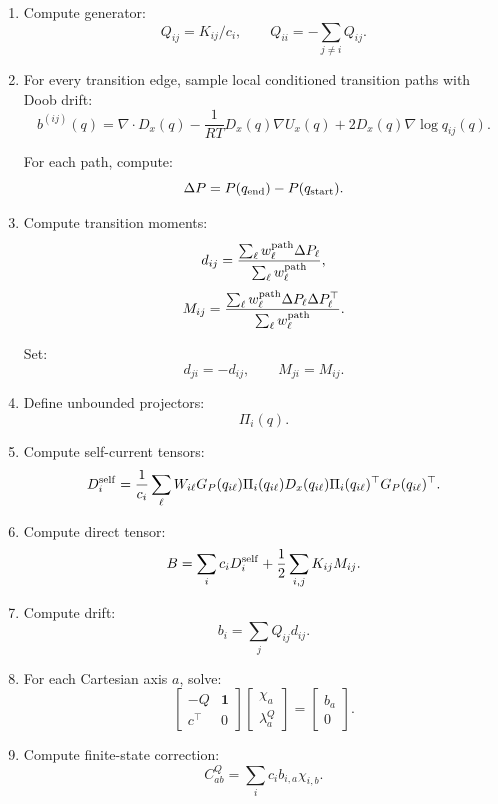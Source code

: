 \documentclass[11pt]{article}
\newcommand{\one}{\mathbf 1}
\begin{document}
\begin{enumerate}
  \item Compute generator:
  \[
  Q_{ij}=K_{ij}/c_i,
  \qquad
  Q_{ii}=-\sum_{j\ne i}Q_{ij}.
  \]

  \item For every transition edge, sample local conditioned transition paths with
  Doob drift:
  \[
  b^{(ij)}(q)
  =
  \nabla\cdot D_x(q)-\frac{1}{RT}D_x(q)\nabla U_x(q)
  +
  2D_x(q)\nabla\log q_{ij}(q).
  \]

  For each path, compute:
  \[
  \Delta P=P(q_{\rm end})-P(q_{\rm start}).
  \]

  \item Compute transition moments:
  \[
  d_{ij}
  =
  \frac{\sum_\ell w_\ell^{\rm path}\Delta P_\ell}
  {\sum_\ell w_\ell^{\rm path}},
  \]
  \[
  M_{ij}
  =
  \frac{\sum_\ell w_\ell^{\rm path}\Delta P_\ell\Delta P_\ell^\top}
  {\sum_\ell w_\ell^{\rm path}}.
  \]

  Set:
  \[
  d_{ji}=-d_{ij},
  \qquad
  M_{ji}=M_{ij}.
  \]

  \item Define unbounded projectors:
  \[
  \Pi_i(q).
  \]

  \item Compute self-current tensors:
  \[
  D_i^{\rm self}
  =
  \frac{1}{c_i}
  \sum_\ell
  W_{i\ell}
  G_P(q_{i\ell})
  \Pi_i(q_{i\ell})
  D_x(q_{i\ell})
  \Pi_i(q_{i\ell})^\top
  G_P(q_{i\ell})^\top.
  \]

  \item Compute direct tensor:
  \[
  B=
  \sum_i c_iD_i^{\rm self}
  +
  \frac12\sum_{i,j}K_{ij}M_{ij}.
  \]

  \item Compute drift:
  \[
  b_i=\sum_jQ_{ij}d_{ij}.
  \]

  \item For each Cartesian axis \(a\), solve:
  \[
  \begin{bmatrix}
  -Q & \one\\
  c^\top & 0
  \end{bmatrix}
  \begin{bmatrix}
  \chi_a\\
  \lambda_a^Q
  \end{bmatrix}
  =
  \begin{bmatrix}
  b_a\\
  0
  \end{bmatrix}.
  \]

  \item Compute finite-state correction:
  \[
  C^Q_{ab}=\sum_i c_i b_{i,a}\chi_{i,b}.
  \]


\end{enumerate}
\end{document}
